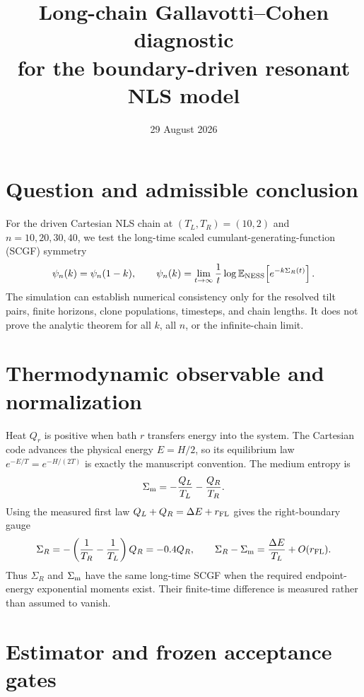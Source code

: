 \documentclass[11pt]{article}
\title{Long-chain Gallavotti--Cohen diagnostic\\
for the boundary-driven resonant NLS model}
\author{}
\date{29 August 2026}
\newcommand{\E}{\mathbb E}
\begin{document}
\maketitle

\section*{Question and admissible conclusion}

For the driven Cartesian NLS chain at $(T_L,T_R)=(10,2)$ and
$n=10,20,30,40$, we test the long-time scaled cumulant-generating-function
(SCGF) symmetry
\begin{equation}
  \psi_n(k)=\psi_n(1-k),\qquad
  \psi_n(k)=\lim_{t\to\infty}\frac1t
  \log\E_{\rm NESS}\!\left[e^{-k\Sigma_R(t)}\right].
  \label{eq:gc}
\end{equation}
The simulation can establish numerical consistency only for the resolved tilt
pairs, finite horizons, clone populations, timesteps, and chain lengths.  It
does not prove the analytic theorem for all $k$, all $n$, or the infinite-chain
limit.

\section{Thermodynamic observable and normalization}

Heat $Q_r$ is positive when bath $r$ transfers energy into the system.  The
Cartesian code advances the physical energy $E=H/2$, so its equilibrium law
$e^{-E/T}=e^{-H/(2T)}$ is exactly the manuscript convention.  The medium
entropy is
\begin{equation}
  \Sigma_{\rm m}=-\frac{Q_L}{T_L}-\frac{Q_R}{T_R}.
\end{equation}
Using the measured first law $Q_L+Q_R=\Delta E+r_{\rm FL}$ gives the
right-boundary gauge
\begin{equation}
  \Sigma_R=-\left(\frac1{T_R}-\frac1{T_L}\right)Q_R=-0.4Q_R,
  \qquad
  \Sigma_R-\Sigma_{\rm m}=\frac{\Delta E}{T_L}+O(r_{\rm FL}).
  \label{eq:gauge}
\end{equation}
Thus $\Sigma_R$ and $\Sigma_{\rm m}$ have the same long-time SCGF when the
required endpoint-energy exponential moments exist.  Their finite-time
difference is measured rather than assumed to vanish.

\section{Estimator and frozen acceptance gates}
\end{document}

